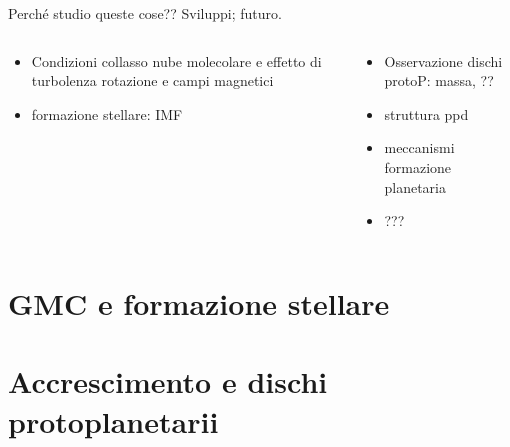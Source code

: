 \documentclass[10pt,xcolor={usenames},fleqn,mathserif,serif]{beamer}
\begin{document}
\begin{wordonframe}{Perch\'e studio queste cose?? Sviluppi; futuro.}
\begin{columns}[T]\begin{column}{0.5\textwidth}
\begin{itemize}
\item Condizioni collasso nube molecolare e effetto di turbolenza rotazione e campi magnetici
\item formazione stellare: IMF
\end{itemize}
\end{column} \begin{column}{0.5\textwidth}
\begin{itemize}
\item Osservazione dischi protoP: massa, ??
\item struttura ppd
\item meccanismi formazione planetaria
\item ???
\end{itemize}
\end{column}  \end{columns}
\end{wordonframe}

\part{GMC e formazione stellare}


\part{Accrescimento e dischi protoplanetarii}

\end{document}
